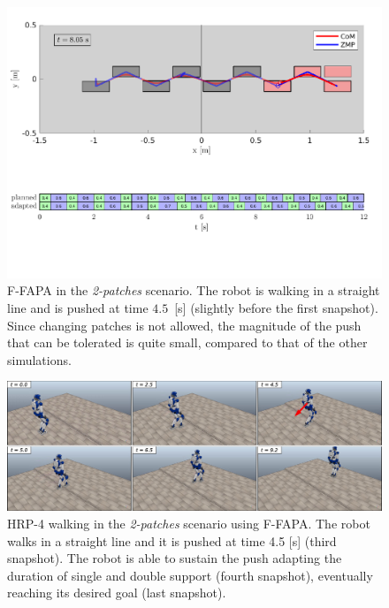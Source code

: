 \begin{figure}
    \includegraphics[trim={0 2.2cm 0 8.6cm},clip,width=\textwidth]{figures/two-patches-fixed-completing-task.pdf}
    \caption{F-FAPA in the {\em 2-patches} scenario. The robot is walking in
        a straight line and is pushed at time $4.5$~[s] (slightly before the
        first snapshot). Since changing patches is not allowed, the magnitude
        of the push that can be tolerated is quite small, compared to that of
        the other simulations.
    }
    \label{fig:FAPA:matlab_2pacf}
\end{figure}

\begin{figure}
    \centering
    \includegraphics[width=\textwidth]{figures/two-patches-push-fixed-snapshots.jpeg}
    \caption{HRP-4 walking in the \textit{2-patches} scenario using F-FAPA.
        The robot walks in a straight line and it is pushed at time 4.5 [s]
        (third snapshot). The robot is able to sustain the push adapting the
        duration of single and double support (fourth snapshot), eventually
        reaching its desired goal (last snapshot).
    }
    \label{fig:FAPA:sim2:snapshots}
\end{figure}

